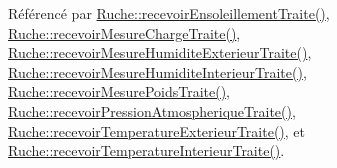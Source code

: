 Référencé par \hyperlink{class_ruche_a581320fbd44c1752d10aa0e6e533863c}{Ruche\+::recevoir\+Ensoleillement\+Traite()}, \hyperlink{class_ruche_a4ad540139115b79cd52336ad1a11453c}{Ruche\+::recevoir\+Mesure\+Charge\+Traite()}, \hyperlink{class_ruche_a2d19d8438eae55c1d76691398087f079}{Ruche\+::recevoir\+Mesure\+Humidite\+Exterieur\+Traite()}, \hyperlink{class_ruche_aab8b4958b32aad9af790963903e4788e}{Ruche\+::recevoir\+Mesure\+Humidite\+Interieur\+Traite()}, \hyperlink{class_ruche_afd8b0d7512f325327704cd3e37091dc2}{Ruche\+::recevoir\+Mesure\+Poids\+Traite()}, \hyperlink{class_ruche_a3b43ce547e616ee0b14e3a0e0aa44a4d}{Ruche\+::recevoir\+Pression\+Atmospherique\+Traite()}, \hyperlink{class_ruche_a1d9b1d3aad20f206f27de4093b4a136f}{Ruche\+::recevoir\+Temperature\+Exterieur\+Traite()}, et \hyperlink{class_ruche_a3a5934e6da843c959f34aecef1217f92}{Ruche\+::recevoir\+Temperature\+Interieur\+Traite()}.


